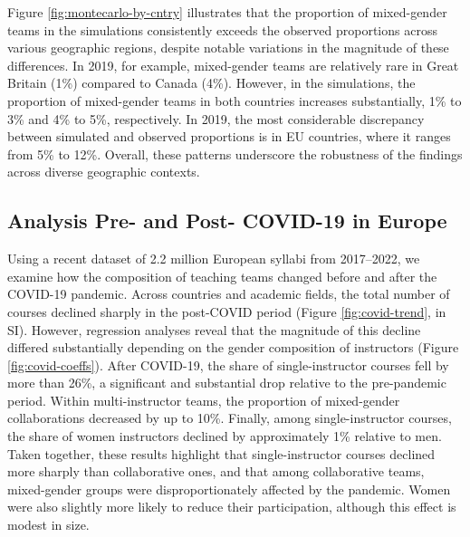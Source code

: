 \documentclass[
  british,
  12pt, %
]{article}
\begin{document}
Figure \ref{fig:montecarlo-by-cntry} illustrates that the proportion of mixed-gender teams in the simulations consistently exceeds the observed proportions across various geographic regions, despite notable variations in the magnitude of these differences. In 2019, for example, mixed-gender teams are relatively rare in Great Britain (1\%) compared to Canada (4\%). However, in the simulations, the proportion of mixed-gender teams in both countries increases substantially, 1\% to 3\% and 4\% to 5\%, respectively. In 2019, the most considerable discrepancy between simulated and observed proportions is in EU countries, where it ranges from 5\% to 12\%. Overall, these patterns underscore the robustness of the findings across diverse geographic contexts.

\subsection{Analysis Pre- and Post- COVID-19 in Europe}\label{analysis-pre--and-post--covid-19-in-europe}

Using a recent dataset of 2.2 million European syllabi from 2017--2022, we examine how the composition of teaching teams changed before and after the COVID-19 pandemic. Across countries and academic fields, the total number of courses declined sharply in the post-COVID period (Figure \ref{fig:covid-trend}, in SI). However, regression analyses reveal that the magnitude of this decline differed substantially depending on the gender composition of instructors (Figure \ref{fig:covid-coeffs}). After COVID-19, the share of single-instructor courses fell by more than 26\%, a significant and substantial drop relative to the pre-pandemic period. Within multi-instructor teams, the proportion of mixed-gender collaborations decreased by up to 10\%. Finally, among single-instructor courses, the share of women instructors declined by approximately 1\% relative to men. Taken together, these results highlight that single-instructor courses declined more sharply than collaborative ones, and that among collaborative teams, mixed-gender groups were disproportionately affected by the pandemic. Women were also slightly more likely to reduce their participation, although this effect is modest in size.
\end{document}
